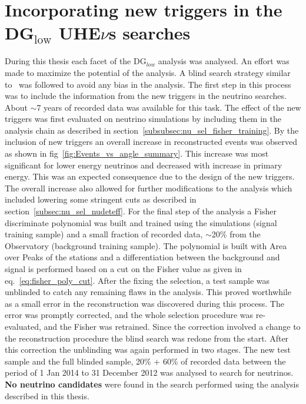 \section*{Incorporating new triggers in the DG$\mathrm{_{low}}$ UHE$\nu$s searches}
During this thesis each facet of the DG$_{low}$ analysis was analysed. An effort was made to maximize the potential of the analysis. A blind search strategy similar to~\cite{gap_note_2013,Aab_2019_diffuse} was followed to avoid any bias in the analysis. The first step in this process was to include the information from the new triggers in the neutrino searches. About $\sim$7 years of recorded data was available for this task. The effect of the new triggers was first evaluated on neutrino simulations by including them in the analysis chain as described in section~\ref{subsubsec:nu_sel_fisher_training}. By the inclusion of new triggers an overall increase in reconstructed events was observed as shown in fig~\ref{fig:Events_vs_angle_summary}. This increase was most significant for lower energy neutrinos and decreased with increase in primary energy. This was an expected consequence due to the design of the new triggers. The overall increase also allowed for further modifications to the analysis which included lowering some stringent cuts as described in section~\ref{subsec:nu_sel_nudeteff}. For the final step of the analysis a Fisher discriminate polynomial was built and trained using the simulations (signal training sample) and a small fraction of recorded data, $\sim$20\% from the Observatory (background training sample). The polynomial is built with Area over Peaks of the stations and a differentiation between the background and signal is performed based on a cut on the Fisher value as given in eq.~\ref{eq:fisher_poly_cut}.
After the fixing the selection, a test sample was unblinded to catch any remaining flaws in the analysis. This proved worthwhile as a small error in the reconstruction was discovered during this process. The error was promptly corrected, and the whole selection procedure was re-evaluated, and the Fisher was retrained. Since the correction involved a change to the reconstruction procedure the blind search was redone from the start. After this correction the unblinding was again performed in two stages. The new test sample and the full blinded sample, 20\% + 60\% of recorded data between the period of 1 Jan 2014 to 31 December 2012 was analysed to search for neutrinos. \textbf{No neutrino candidates} were found in the search performed using the analysis described in this thesis. 

